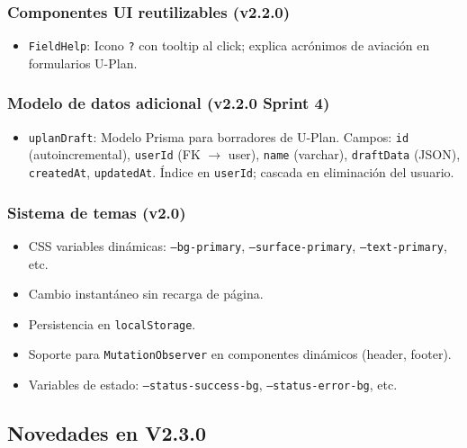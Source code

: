 \documentclass[12pt,a4paper]{article}
\begin{document}
\subsubsection*{Componentes UI reutilizables (v2.2.0)}
\begin{itemize}
    \item \texttt{FieldHelp}: Icono \texttt{?} con tooltip al click; explica acrónimos de aviación en formularios U-Plan.
\end{itemize}

\subsubsection*{Modelo de datos adicional (v2.2.0 Sprint 4)}
\begin{itemize}
    \item \texttt{uplanDraft}: Modelo Prisma para borradores de U-Plan. Campos: \texttt{id} (autoincremental), \texttt{userId} (FK $\rightarrow$ user), \texttt{name} (varchar), \texttt{draftData} (JSON), \texttt{createdAt}, \texttt{updatedAt}. Índice en \texttt{userId}; cascada en eliminación del usuario.
\end{itemize}

\subsubsection*{Sistema de temas (v2.0)}
\begin{itemize}
    \item CSS variables dinámicas: \texttt{--bg-primary}, \texttt{--surface-primary}, \texttt{--text-primary}, etc.
    \item Cambio instantáneo sin recarga de página.
    \item Persistencia en \texttt{localStorage}.
    \item Soporte para \texttt{MutationObserver} en componentes dinámicos (header, footer).
    \item Variables de estado: \texttt{--status-success-bg}, \texttt{--status-error-bg}, etc.
\end{itemize}


\subsection*{Novedades en V2.3.0}
\end{document}
